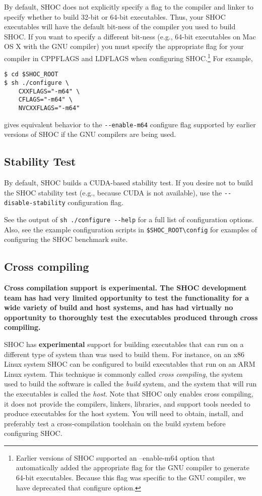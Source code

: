 \documentclass[11pt]{article}
\begin{document}
By default, SHOC does not explicitly specify a flag to the compiler and 
linker to specify whether to build 32-bit or 64-bit executables.
Thus, your SHOC executables will have the default bit-ness of the compiler 
you used to build SHOC.
If you want to specify a different bit-ness (e.g., 64-bit executables on 
Mac OS X with the GNU compiler) you must specify the appropriate flag
for your compiler in CPPFLAGS and LDFLAGS when configuring 
SHOC.\footnote{Earlier versions of SHOC supported an --enable-m64 option 
that automatically added the appropriate flag for the GNU compiler to generate
64-bit executables.  Because this flag was specific to the GNU compiler, we have
deprecated that configure option.}
For example,
\begin{Verbatim}[frame=single]
$ cd $SHOC_ROOT
$ sh ./configure \
    CXXFLAGS="-m64" \
    CFLAGS="-m64" \
    NVCXXFLAGS="-m64"
\end{Verbatim}
\noindent gives equivalent behavior to the \verb+--enable-m64+ configure flag
supported by earlier versions of SHOC if the GNU compilers are being used.

\subsection{Stability Test}\label{sec:confstability}

By default, SHOC builds a CUDA-based stability test.
If you desire not to build the SHOC stability test (e.g., because CUDA is
not available), use the \verb+--disable-stability+ configuration flag.

See the output of \verb+sh ./configure --help+ for a full list of configuration 
options.
Also, see the example configuration scripts in \verb+$SHOC_ROOT\config+ for
examples of configuring the SHOC benchmark suite.

\subsection{Cross compiling}

{\bf 
Cross compilation support is experimental.
The SHOC development team has had very limited opportunity to test the
functionality for a wide variety of build and host systems, and has had
virtually no opportunity to thoroughly test the executables produced through
cross compiling.
}

SHOC has {\bf experimental} support for building executables that can run on
a different type of system than was used to build them.
For instance, on an x86 Linux system SHOC can be configured to build 
executables that run on an ARM Linux system.
This technique is commonly called {\em cross compiling}, the system
used to build the software is called the {\em build} system, and the system
that will run the executables is called the {\em host}.
Note that SHOC only enables cross compiling, it does not provide
the compilers, linkers, libraries, and support tools needed to produce
executables for the host system.
You will need to obtain, install, and preferably test a cross-compilation
toolchain on the build system before configuring SHOC.
\end{document}
